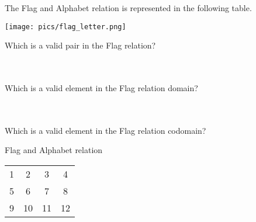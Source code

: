 \documentclass{ximera}
\begin{document}
\begin{exercise}
The Flag and Alphabet relation is represented in the following table.


\texttt{[image: pics/flag\_letter.png]}

Which is a valid pair in the Flag relation?
\begin{selectAll}
  \end{selectAll}

\\
\\


Which is a valid element in the Flag relation domain?
\begin{selectAll}
  \end{selectAll}
  
  \\
  \\

Which is a valid element in the Flag relation codomain?
\begin{selectAll}
  \end{selectAll}
  
  
  
  

\end{exercise}






\begin{exercise}
Flag and Alphabet relation


\begin{tabular}{c | c | c | c}

1 & 2 & 3 & 4 \\

5 & 6 & 7 & 8 \\

9 & 10 & 11 & 12

\end{tabular}

\end{exercise}
\end{document}
